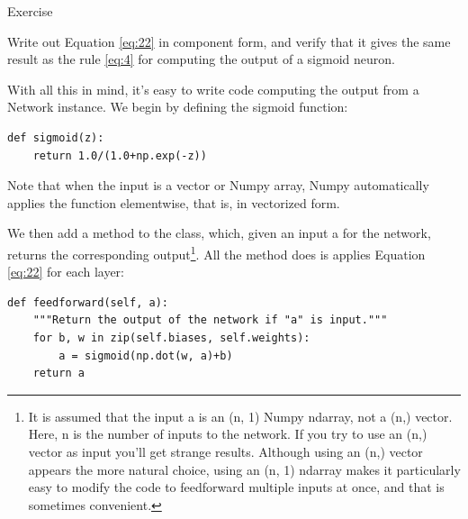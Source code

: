\documentclass[a4paper,twoside,10pt]{book}
\begin{document}
\begin{exercize}{Exercise}
\item  Write out Equation \ref{eq:22} in component form, and verify that it gives the same result as the rule \ref{eq:4} for computing the output of a sigmoid neuron.
\end{exercize}
With all this in mind, it's easy to write code computing the output from a Network instance. We begin by defining the sigmoid function:
\begin{lstlisting}
def sigmoid(z):
	return 1.0/(1.0+np.exp(-z))
\end{lstlisting}
Note that when the input  is a vector or Numpy array, Numpy automatically applies the function  elementwise, that is, in vectorized form.

We then add a  method to the  class, which, given an input a for the network, returns the corresponding output\footnote{It is assumed that the input a is an (n, 1) Numpy ndarray, not a (n,) vector. Here, n is the number of inputs to the network. If you try to use an (n,) vector as input you'll get strange results. Although using an (n,) vector appears the more natural choice, using an (n, 1) ndarray makes it particularly easy to modify the code to feedforward multiple inputs at once, and that is sometimes convenient.}. All the method does is applies Equation \ref{eq:22} for each layer:
\begin{lstlisting}
def feedforward(self, a):
	"""Return the output of the network if "a" is input."""
	for b, w in zip(self.biases, self.weights):
		a = sigmoid(np.dot(w, a)+b)	
	return a
\end{lstlisting}
\end{document}
